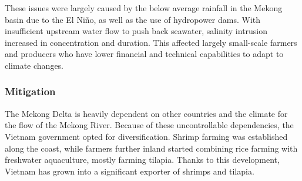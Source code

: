 These issues were largely caused by the below average rainfall in the Mekong basin due to the El Niño, as well as the use of hydropower dams. With insufficient upstream water flow to push back seawater, salinity intrusion increased in concentration and duration. This affected largely small-scale farmers and producers who have lower financial and technical capabilities to adapt to climate changes.

\subsubsection{Mitigation}

The Mekong Delta is heavily dependent on other countries and the climate for the flow of the Mekong River. Because of these uncontrollable dependencies, the Vietnam government opted for diversification. Shrimp farming was established along the coast, while farmers further inland started combining rice farming with freshwater aquaculture, mostly farming tilapia. Thanks to this development, Vietnam has grown into a significant exporter of shrimps and tilapia. \cite{wyrdykes}